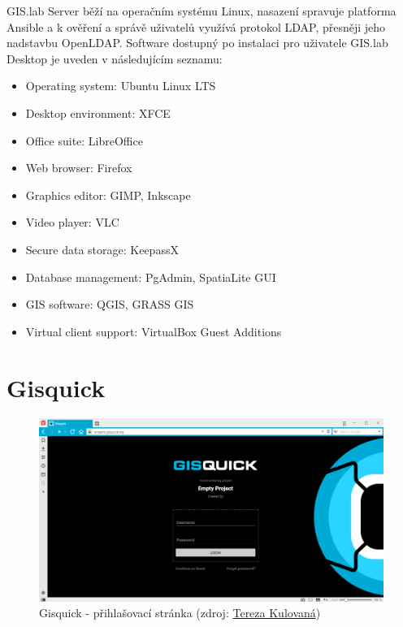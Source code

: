 GIS.lab Server běží na operačním systému Linux, nasazení spravuje
platforma Ansible a k ověření a správě uživatelů využívá protokol
LDAP, přesněji jeho nadstavbu OpenLDAP. Software dostupný po instalaci
pro uživatele GIS.lab Desktop je uveden v následujícím seznamu:
\begin{itemize}
\item Operating system: Ubuntu Linux LTS
\item Desktop environment: XFCE
\item Office suite: LibreOffice
\item Web browser: Firefox
\item Graphics editor: GIMP, Inkscape
\item Video player: VLC
\item Secure data storage: KeepassX
\item Database management: PgAdmin, SpatiaLite GUI
\item GIS software: QGIS, GRASS GIS
\item Virtual client support: VirtualBox Guest Additions
\end{itemize}

\section{Gisquick}
\label{gisquick}

\begin{figure}[H] \centering
    \includegraphics[width=400pt]{./pictures/gisquick-welcome-screen.png}
    \caption[Gisquick - přihlašovací stránka]{Gisquick - přihlašovací stránka (zdroj:
	\href{}{Tereza Kulovaná})}
    \label{fig:gisquick-welcome}
\end{figure}

